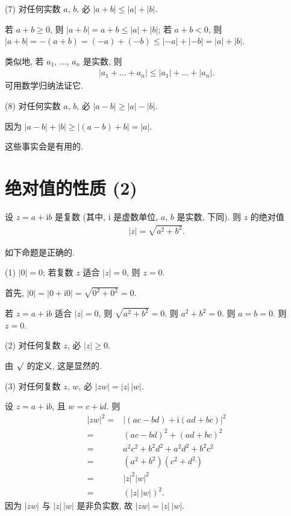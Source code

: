 (7)
对任何实数 \(a\), \(b\), 必 \(|{a + b}| \leq |a| + |b|\).

若 \(a + b \geq 0\), 则 \(|{a + b}| = a + b \leq |a| + |b|\);
若 \(a + b < 0\), 则 \(|{a + b}| = -(a + b)
= (-a) + (-b) \leq |{-a}| + |{-b}| = |a| + |b|\).

类似地, 若 \(a_1\), \(\dots\), \(a_n\) 是实数, 则
\begin{align*}
    |{a_1 + \dots + a_n}| \leq |a_1| + \dots + |a_n|.
\end{align*}
可用数学归纳法证它.

(8)
对任何实数 \(a\), \(b\), 必 \(|{a - b}| \geq |a| - |b|\).

因为 \(|{a - b}| + |b| \geq |{(a - b) + b}| = |a|\).

\vspace{2ex}

这些事实会是有用的.

\section{绝对值的性质 (2)}

设 \(z = a + \mathrm{i} b\) 是复数
(其中, \(\mathrm{i}\) 是虚数单位,
\(a\), \(b\) 是实数, 下同).
则 \(z\) 的绝对值
\begin{align*}
    |z| = \sqrt{a^2 + b^2}.
\end{align*}

如下命题是正确的.

(1)
\(|0| = 0\);
若复数 \(z\) 适合 \(|z| = 0\), 则 \(z = 0\).

首先, \(|0| = |{0 + \mathrm{i} 0}| = \sqrt{0^2 + 0^2} = 0\).

若 \(z = a + \mathrm{i} b\) 适合 \(|z| = 0\),
则 \(\sqrt{a^2 + b^2} = 0\).
则 \(a^2 + b^2 = 0\).
则 \(a = b = 0\).
则 \(z = 0\).

(2)
对任何复数 \(z\), 必 \(|z| \geq 0\).

由 \(\surd\) 的定义, 这是显然的.

(3)
对任何复数 \(z\), \(w\), 必 \(|zw| = |z|\, |w|\).

设 \(z = a + \mathrm{i} b\), 且 \(w = c + \mathrm{i} d\).
则
\begin{align*}
    |zw|^2
    = {} & |{(ac - bd) + \mathrm{i} (ad + bc)}|^2 \\
    = {} & (ac - bd)^2 + (ad + bc)^2              \\
    = {} & a^2 c^2 + b^2 d^2 + a^2 d^2 + b^2 c^2  \\
    = {} & (a^2 + b^2) (c^2 + d^2)                \\
    = {} & |z|^2 |w|^2                            \\
    = {} & (|z|\, |w|)^2.
\end{align*}
因为 \(|zw|\) 与 \(|z|\, |w|\) 是非负实数,
故 \(|zw| = |z|\, |w|\).

